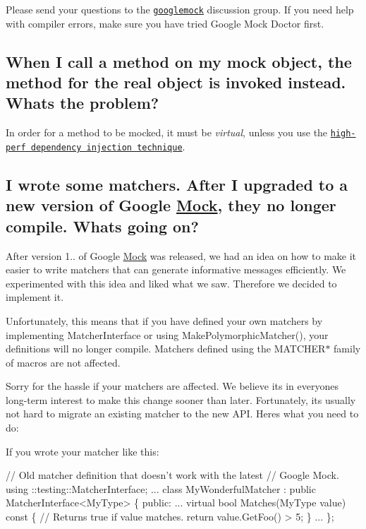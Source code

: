 Please send your questions to the \href{http://groups.google.com/group/googlemock}{\tt googlemock} discussion group. If you need help with compiler errors, make sure you have tried Google Mock Doctor first.

\subsection*{When I call a method on my mock object, the method for the real object is invoked instead. What\textquotesingle{}s the problem?}

In order for a method to be mocked, it must be {\itshape virtual}, unless you use the \href{http://code.google.com/p/googlemock/wiki/V1_6_CookBook#Mocking_Nonvirtual_Methods}{\tt high-\/perf dependency injection technique}.

\subsection*{I wrote some matchers. After I upgraded to a new version of Google \hyperlink{class_mock}{Mock}, they no longer compile. What\textquotesingle{}s going on?}

After version 1.. of Google \hyperlink{class_mock}{Mock} was released, we had an idea on how to make it easier to write matchers that can generate informative messages efficiently. We experimented with this idea and liked what we saw. Therefore we decided to implement it.

Unfortunately, this means that if you have defined your own matchers by implementing {\ttfamily Matcher\+Interface} or using {\ttfamily Make\+Polymorphic\+Matcher()}, your definitions will no longer compile. Matchers defined using the {\ttfamily M\+A\+T\+C\+H\+E\+R$\ast$} family of macros are not affected.

Sorry for the hassle if your matchers are affected. We believe it\textquotesingle{}s in everyone\textquotesingle{}s long-\/term interest to make this change sooner than later. Fortunately, it\textquotesingle{}s usually not hard to migrate an existing matcher to the new A\+PI. Here\textquotesingle{}s what you need to do\+:

If you wrote your matcher like this\+: 
\begin{DoxyCode}
// Old matcher definition that doesn't work with the latest
// Google Mock.
using ::testing::MatcherInterface;
...
class MyWonderfulMatcher : public MatcherInterface<MyType> \{
 public:
  ...
  virtual bool Matches(MyType value) const \{
    // Returns true if value matches.
    return value.GetFoo() > 5;
  \}
  ...
\};
\end{DoxyCode}


